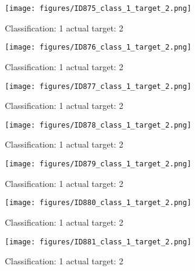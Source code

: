 \begin{figure}[h!]
\begin{center}
\texttt{[image: figures/ID875\_class\_1\_target\_2.png]}
\end{center}
\caption{ Classification: 1 actual target: 2}
\label{fig:ID875_class_1_target_2}
\end{figure}
\begin{figure}[h!]
\begin{center}
\texttt{[image: figures/ID876\_class\_1\_target\_2.png]}
\end{center}
\caption{ Classification: 1 actual target: 2}
\label{fig:ID876_class_1_target_2}
\end{figure}
\begin{figure}[h!]
\begin{center}
\texttt{[image: figures/ID877\_class\_1\_target\_2.png]}
\end{center}
\caption{ Classification: 1 actual target: 2}
\label{fig:ID877_class_1_target_2}
\end{figure}
\begin{figure}[h!]
\begin{center}
\texttt{[image: figures/ID878\_class\_1\_target\_2.png]}
\end{center}
\caption{ Classification: 1 actual target: 2}
\label{fig:ID878_class_1_target_2}
\end{figure}
\begin{figure}[h!]
\begin{center}
\texttt{[image: figures/ID879\_class\_1\_target\_2.png]}
\end{center}
\caption{ Classification: 1 actual target: 2}
\label{fig:ID879_class_1_target_2}
\end{figure}
\begin{figure}[h!]
\begin{center}
\texttt{[image: figures/ID880\_class\_1\_target\_2.png]}
\end{center}
\caption{ Classification: 1 actual target: 2}
\label{fig:ID880_class_1_target_2}
\end{figure}
\begin{figure}[h!]
\begin{center}
\texttt{[image: figures/ID881\_class\_1\_target\_2.png]}
\end{center}
\caption{ Classification: 1 actual target: 2}
\label{fig:ID881_class_1_target_2}
\end{figure}
